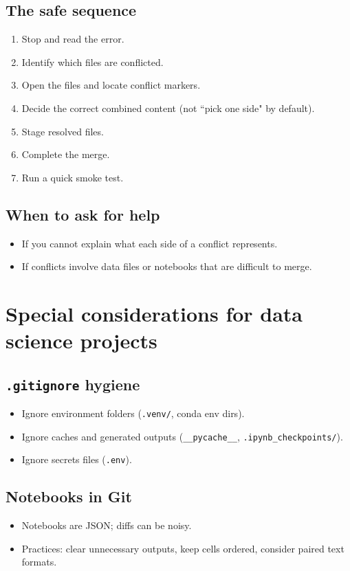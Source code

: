\subsection{The safe sequence}
\begin{enumerate}
\item Stop and read the error.
\item Identify which files are conflicted.
\item Open the files and locate conflict markers.
\item Decide the correct combined content (not ``pick one side" by default).
\item Stage resolved files.
\item Complete the merge.
\item Run a quick smoke test.
\end{enumerate}

\subsection{When to ask for help}
\begin{itemize}
\item If you cannot explain what each side of a conflict represents.
\item If conflicts involve data files or notebooks that are difficult to merge.
\end{itemize}

\section{Special considerations for data science projects}
\subsection{\texttt{.gitignore} hygiene}
\begin{itemize}
\item Ignore environment folders (\texttt{.venv/}, conda env dirs).
\item Ignore caches and generated outputs (\texttt{__pycache__}, \texttt{.ipynb_checkpoints/}).
\item Ignore secrets files (\texttt{.env}).
\end{itemize}

\subsection{Notebooks in Git}
\begin{itemize}
\item Notebooks are JSON; diffs can be noisy.
\item Practices: clear unnecessary outputs, keep cells ordered, consider paired text formats.
\end{itemize}

